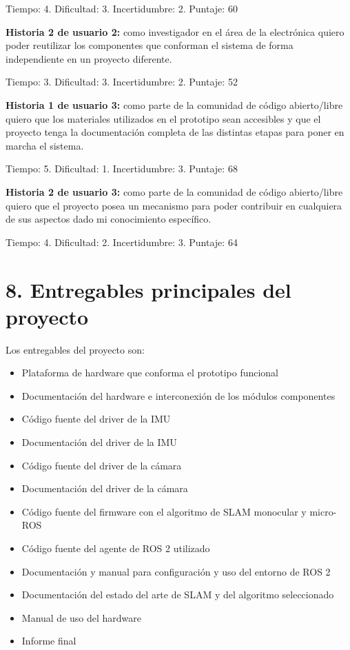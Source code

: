 \documentclass[
11pt, %
codirector, %
]{charter}
\begin{document}
Tiempo: 4. Dificultad: 3. Incertidumbre: 2. Puntaje: 60

\textbf{Historia 2 de usuario 2:} como investigador en el área de la electrónica quiero poder reutilizar los componentes que conforman el sistema de forma independiente en un proyecto diferente.

Tiempo: 3. Dificultad: 3. Incertidumbre: 2. Puntaje: 52

\textbf{Historia 1 de usuario 3:} como parte de la comunidad de código abierto/libre quiero que los materiales utilizados en el prototipo sean accesibles y que el proyecto tenga la documentación completa de las distintas etapas para poner en marcha el sistema.

Tiempo: 5. Dificultad: 1. Incertidumbre: 3. Puntaje: 68

\textbf{Historia 2 de usuario 3:} como parte de la comunidad de código abierto/libre quiero que el proyecto posea un mecanismo para poder contribuir en cualquiera de sus aspectos dado mi conocimiento específico.

Tiempo: 4. Dificultad: 2. Incertidumbre: 3. Puntaje: 64

\section{8. Entregables principales del proyecto}
\label{sec:entregables}

Los entregables del proyecto son:
\begin{itemize}
	\item Plataforma de hardware que conforma el prototipo funcional
	\item Documentación del hardware e interconexión de los módulos componentes
	\item Código fuente del driver de la IMU
	\item Documentación del driver de la IMU
	\item Código fuente del driver de la cámara
	\item Documentación del driver de la cámara
	\item Código fuente del firmware con el algoritmo de SLAM monocular y micro-ROS
	\item Código fuente del agente de ROS 2 utilizado
	\item Documentación y manual para configuración y uso del entorno de ROS 2
	\item Documentación del estado del arte de SLAM y del algoritmo seleccionado
	\item Manual de uso del hardware
	\item Informe final
\end{itemize}
\end{document}
